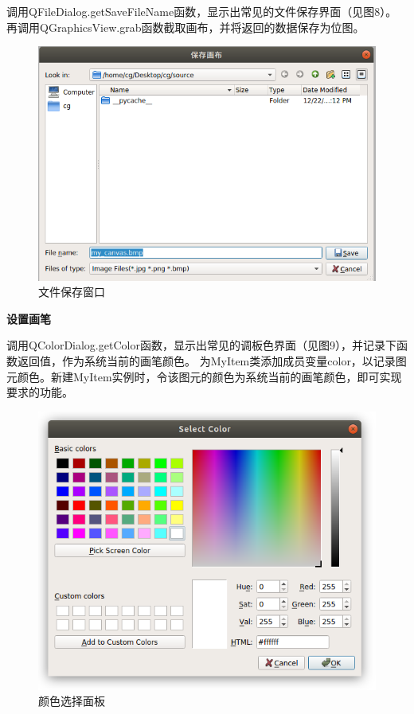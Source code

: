 \documentclass[a4paper,UTF8]{article}
\begin{document}
调用QFileDialog.getSaveFileName函数，显示出常见的文件保存界面（见图8）。
再调用QGraphicsView.grab函数截取画布，并将返回的数据保存为位图。
\begin{figure}[H]
    \centering
    \includegraphics[scale=0.8]{save-canvas.PNG}
    \caption{文件保存窗口}
\end{figure}


\textbf{设置画笔}

调用QColorDialog.getColor函数，显示出常见的调板色界面（见图9），并记录下函数返回值，作为系统当前的画笔颜色。
为MyItem类添加成员变量color，以记录图元颜色。新建MyItem实例时，令该图元的颜色为系统当前的画笔颜色，即可实现要求的功能。

\begin{figure}[H]
	\centering
	\includegraphics[scale=0.8]{select-color.PNG}
	\caption{颜色选择面板}
\end{figure}
\end{document}
